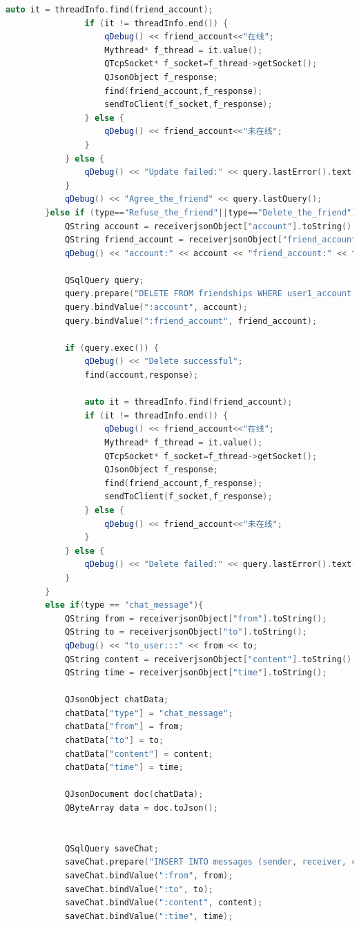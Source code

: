 \documentclass[UTF8]{ctexart}
\begin{document}
\begin{lstlisting}[language=C++, caption=服务端接受信息并处理]
				auto it = threadInfo.find(friend_account);
				if (it != threadInfo.end()) {
					qDebug() << friend_account<<"在线";
					Mythread* f_thread = it.value();
					QTcpSocket* f_socket=f_thread->getSocket();
					QJsonObject f_response;
					find(friend_account,f_response);
					sendToClient(f_socket,f_response);
				} else {
					qDebug() << friend_account<<"未在线";
				}
			} else {
				qDebug() << "Update failed:" << query.lastError().text();
			}
			qDebug() << "Agree_the_friend" << query.lastQuery();
		}else if (type=="Refuse_the_friend"||type=="Delete_the_friend"){
			QString account = receiverjsonObject["account"].toString();
			QString friend_account = receiverjsonObject["friend_account"].toString();
			qDebug() << "account:" << account << "friend_account:" << friend_account;
			
			QSqlQuery query;
			query.prepare("DELETE FROM friendships WHERE user1_account = :friend_account AND user2_account = :account;");
			query.bindValue(":account", account);
			query.bindValue(":friend_account", friend_account);
			
			if (query.exec()) {
				qDebug() << "Delete successful";
				find(account,response);
				
				auto it = threadInfo.find(friend_account);
				if (it != threadInfo.end()) {
					qDebug() << friend_account<<"在线";
					Mythread* f_thread = it.value();
					QTcpSocket* f_socket=f_thread->getSocket();
					QJsonObject f_response;
					find(friend_account,f_response);
					sendToClient(f_socket,f_response);
				} else {
					qDebug() << friend_account<<"未在线";
				}
			} else {
				qDebug() << "Delete failed:" << query.lastError().text();
			}
		}
		else if(type == "chat_message"){
			QString from = receiverjsonObject["from"].toString();
			QString to = receiverjsonObject["to"].toString();
			qDebug() << "to_user:::" << from << to;
			QString content = receiverjsonObject["content"].toString();
			QString time = receiverjsonObject["time"].toString();
			
			QJsonObject chatData;
			chatData["type"] = "chat_message";
			chatData["from"] = from;
			chatData["to"] = to;
			chatData["content"] = content;
			chatData["time"] = time;
			
			QJsonDocument doc(chatData);
			QByteArray data = doc.toJson();
			
			
			QSqlQuery saveChat;
			saveChat.prepare("INSERT INTO messages (sender, receiver, content, time) VALUES (:from, :to, :content, :time)");
			saveChat.bindValue(":from", from);
			saveChat.bindValue(":to", to);
			saveChat.bindValue(":content", content);
			saveChat.bindValue(":time", time);
			

\end{lstlisting}
\end{document}
